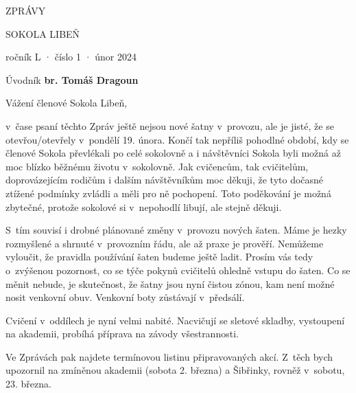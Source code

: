 \documentclass[11pt]{article}
\begin{document}
\pagecolor{sokolred}
\color{white}
\begin{center}
\vspace*{\fill}

{\titlesize \fugner ZPRÁVY}

{\titlesize \tyrs SOKOLA LIBEŇ}

\vspace*{1cm}

{\large ročník L · číslo 1 · únor 2024}

\vspace*{\fill}
\end{center}

\clearpage
\normalcolor
\nopagecolor
{}

\pagestyle{uvodnik}


{\fontsize{48pt}{57pt} \fugner \color{sokolred} \noindent Úvodník}
\hfill
{\textbf{br. Tomáš Dragoun}} %

\vspace*{12pt}

\noindent
Vážení členové Sokola Libeň,

\noindent
v~čase psaní těchto Zpráv ještě nejsou nové šatny v~provozu, ale je jisté, že se otevřou/otevřely v~pondělí 19. února. Končí tak nepříliš pohodlné období, kdy se členové Sokola převlékali po celé sokolovně a i návštěvníci Sokola byli možná až moc blízko \luv{}běžnému\ruv{} životu v~sokolovně. Jak cvičencům, tak cvičitelům, doprovázejícím rodičům i dalším návštěvníkům moc děkuji, že tyto dočasné ztížené podmínky zvládli a měli pro ně pochopení. Toto poděkování je možná zbytečné, protože sokolové si v~nepohodlí libují, ale stejně děkuji.

S~tím souvisí i drobné plánované změny v~provozu nových šaten. Máme je hezky rozmyšlené a shrnuté v~provozním řádu, ale až praxe je prověří. Nemůžeme vyloučit, že pravidla používání šaten budeme ještě ladit. Prosím vás tedy o~zvýšenou pozornost, co se týče pokynů cvičitelů ohledně vstupu do šaten. Co se měnit nebude, je skutečnost, že šatny jsou nyní \luv{}čistou zónou\ruv{}, kam není možné nosit venkovní obuv. Venkovní boty zůstávají v~předsálí.

Cvičení v~oddílech je nyní velmi nabité. Nacvičují se sletové skladby, vystoupení na akademii, probíhá příprava na závody všestrannosti.

Ve Zprávách pak najdete termínovou listinu připravovaných akcí. Z~těch bych upozornil na zmíněnou akademii (sobota 2. března) a Šibřinky, rovněž v~sobotu, 23. března.
\end{document}
